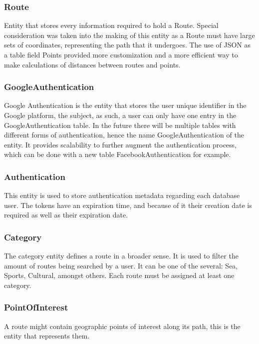        \subsubsection*{Route}
        Entity that stores every information required to hold a Route. Special consideration was taken into the making
        of this entity as a Route must have large sets of coordinates, representing the path that it undergoes. The 
        use of JSON as a table field Points provided more customization and a more efficient way to make calculations 
        of distances between routes and points. 

        \subsubsection*{GoogleAuthentication}
        Google Authentication is the entity that stores the user unique identifier in the Google platform, the subject, as such,
        a user can only have one entry in the GoogleAuthentication table.
        In the future there will be multiple tables with different forms of authentication, hence the name GoogleAuthentication 
        of the entity. It provides scalability to further augment the authentication process, which can be done
        with a new table FacebookAuthentication for example.

        \subsubsection*{Authentication}
        This entity is used to store authentication metadata regarding each database user. The tokens have an expiration time,
        and because of it their creation date is required as well as their expiration date.

        \subsubsection*{Category}
        The category entity defines a route in a broader sense. It is used to filter the amount of routes being 
        searched by a user. It can be one of the several: Sea, Sports, Cultural, amongst others.
        Each route must be assigned at least one category.

        \subsubsection*{PointOfInterest}
        A route might contain geographic points of interest along its path, this is the entity that represents them. 

